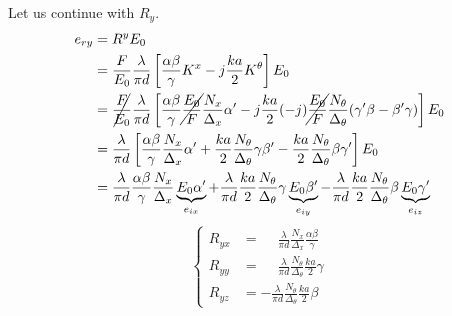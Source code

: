 Let us continue with $R_y$.
\begin{align*}
    e_{ry}
    &= R^y E_0
    \\
    &= \frac{F}{E_0}
       \frac{\lambda}{\pi d}
       \left[
           \frac{\alpha \beta}{\gamma}
           K^x
           -
           j
           \frac{ka}{2}
           K^\theta           
       \right]
       E_0
    \\
    &= \cancel{\frac{F}{E_0}}
       \frac{\lambda}{\pi d}
       \left[
           \frac{\alpha \beta}{\gamma}
           \cancel{\frac{E_0}{F}}
           \frac{N_x}{\Delta_x}
           \alpha'
           -
           j
           \frac{ka}{2}
           (-j)
           \cancel{\frac{E_0}{F}}
           \frac{N_\theta}{\Delta_\theta}
           (\gamma' \beta - \beta' \gamma)           
       \right]
       E_0
    \\
    &= \frac{\lambda}{\pi d}
       \left[
           \frac{\alpha \beta}{\gamma}
           \frac{N_x}{\Delta_x}
           \alpha'
           +
           \frac{ka}{2}
           \frac{N_\theta}{\Delta_\theta}
           \gamma
           \beta'
           -
           \frac{ka}{2}
           \frac{N_\theta}{\Delta_\theta}
           \beta
           \gamma'
       \right]
       E_0
    \\
    &= \frac{\lambda}{\pi d}
       \frac{\alpha \beta}{\gamma}
       \frac{N_x}{\Delta_x}
       \underbrace{E_0 \alpha'}_{e_{ix}}
       +
       \frac{\lambda}{\pi d}
       \frac{ka}{2}
       \frac{N_\theta}{\Delta_\theta}
       \gamma
       \underbrace{E_0 \beta'}_{e_{iy}}
       -
       \frac{\lambda}{\pi d}
       \frac{ka}{2}
       \frac{N_\theta}{\Delta_\theta}
       \beta
       \underbrace{E_0 \gamma'}_{e_{iz}}
\end{align*}
\begin{equation}
    \left\lbrace
    \begin{aligned}
        R_{yx}
        &=
        \phantom{-}
        \frac{\lambda}{\pi d}
        \frac{N_x}{\Delta_x}
        \frac{\alpha \beta}{\gamma}
        \\
        R_{yy}
        &=
        \phantom{-}
        \frac{\lambda}{\pi d}
        \frac{N_\theta}{\Delta_\theta}
        \frac{ka}{2}
        \gamma
        \\
        R_{yz}
        &=
        -
        \frac{\lambda}{\pi d}
        \frac{N_\theta}{\Delta_\theta}
        \frac{ka}{2}
        \beta
    \end{aligned}
    \right.
\end{equation}
